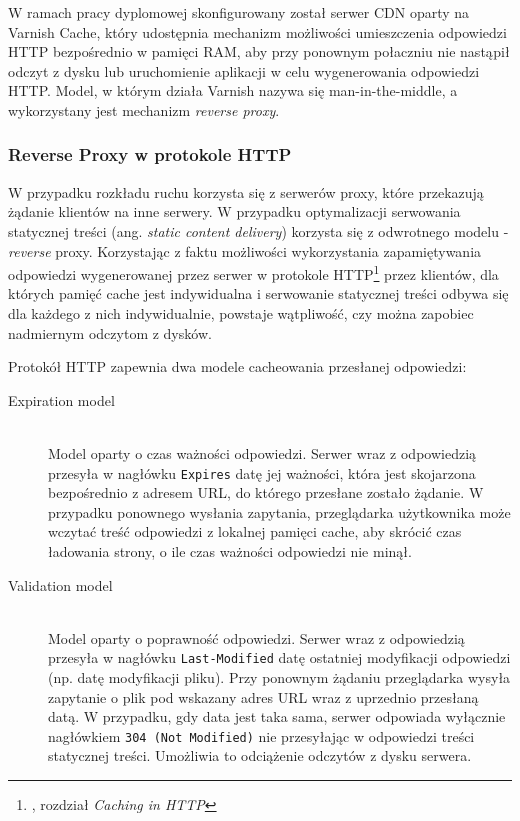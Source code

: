 W ramach pracy dyplomowej skonfigurowany został serwer CDN oparty na Varnish Cache, który udostępnia mechanizm możliwości umieszczenia odpowiedzi HTTP bezpośrednio w pamięci RAM, aby przy ponownym połaczniu nie nastąpił odczyt z dysku lub uruchomienie aplikacji w celu wygenerowania odpowiedzi HTTP. Model, w którym działa Varnish nazywa się man-in-the-middle, a wykorzystany jest mechanizm \emph{reverse proxy}.

\subsubsection{Reverse Proxy w protokole HTTP}

W przypadku rozkładu ruchu korzysta się z serwerów proxy, które przekazują żądanie klientów na inne serwery. W przypadku optymalizacji serwowania statycznej treści (ang. \emph{static content delivery}) korzysta się z odwrotnego modelu - \emph{reverse} proxy. Korzystając z faktu możliwości wykorzystania zapamiętywania odpowiedzi wygenerowanej przez serwer w protokole HTTP\cite{http-rfc}\footnote{\cite{http-rfc}, rozdział \emph{Caching in HTTP}} przez klientów, dla których pamięć cache jest indywidualna i serwowanie statycznej treści odbywa się dla każdego z nich indywidualnie, powstaje wątpliwość, czy można zapobiec nadmiernym odczytom z dysków.

Protokół HTTP zapewnia dwa modele cacheowania przesłanej odpowiedzi:

\begin{description}
  \item[Expiration model] \hfill \\
  Model oparty o czas ważności odpowiedzi. Serwer wraz z odpowiedzią przesyła w nagłówku \lstinline{Expires} datę jej ważności, która jest skojarzona bezpośrednio z adresem URL, do którego przesłane zostało żądanie. W przypadku ponownego wysłania zapytania, przeglądarka użytkownika może wczytać treść odpowiedzi z lokalnej pamięci cache, aby skrócić czas ładowania strony, o ile czas ważności odpowiedzi nie minął.
  \item[Validation model] \hfill \\
  Model oparty o poprawność odpowiedzi. Serwer wraz z odpowiedzią przesyła w nagłówku \lstinline{Last-Modified} datę ostatniej modyfikacji odpowiedzi (np. datę modyfikacji pliku). Przy ponownym żądaniu przeglądarka wysyła zapytanie o plik pod wskazany adres URL wraz z uprzednio przesłaną datą. W przypadku, gdy data jest taka sama, serwer odpowiada wyłącznie nagłówkiem \lstinline{304 (Not Modified)} nie przesyłając w odpowiedzi treści statycznej treści. Umożliwia to odciążenie odczytów z dysku serwera.
\end{description}

